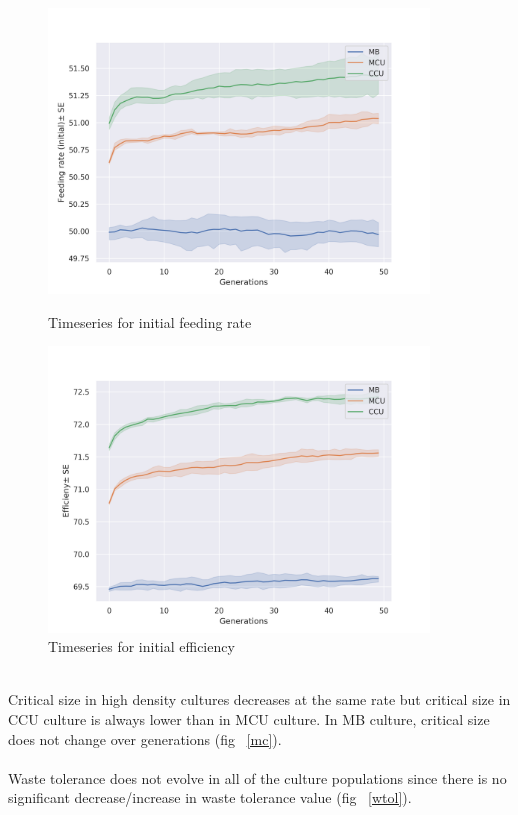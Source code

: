 \begin{figure}
  \centering
  \includegraphics[width=0.9\textwidth]{C4/Figs/fr}
  \caption{Timeseries for initial feeding rate}
  \label{fr}
  \includegraphics[width=0.9\textwidth]{C4/Figs/eff}
  \caption{Timeseries for initial efficiency}
  \label{eff}
\end{figure}\\
\newpage
Critical size in high density cultures decreases at the same rate but critical size in CCU culture is always lower than in MCU culture. In MB culture, critical size does not change over generations (fig ~\ref{mc}). \\\\
Waste tolerance does not evolve in all of the culture populations since there is no significant decrease/increase in waste tolerance value (fig ~\ref{wtol}).
\newpage
